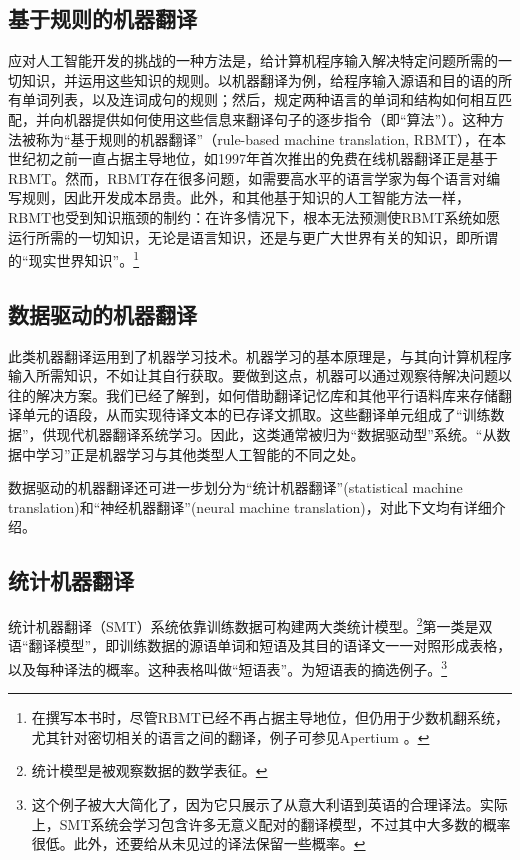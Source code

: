 \documentclass[output=paper]{langscibook}
\begin{document}
\subsection{基于规则的机器翻译}
应对人工智能开发的挑战的一种方法是，给计算机程序输入解决特定问题所需的一切知识，并运用这些知识的规则。以机器翻译为例，给程序输入源语和目的语的所有单词列表，以及连词成句的规则；然后，规定两种语言的单词和结构如何相互匹配，并向机器提供如何使用这些信息来翻译句子的逐步指令（即“算法”）。这种方法被称为“基于规则的机器翻译”（rule-based machine translation, RBMT），在本世纪初之前一直占据主导地位，如1997年首次推出的免费在线机器翻译正是基于RBMT\citep{Joscelyne1998}。然而，RBMT存在很多问题，如需要高水平的语言学家为每个语言对编写规则，因此开发成本昂贵。此外，和其他基于知识的人工智能方法一样\citep{deeplearningbook}，RBMT也受到知识瓶颈的制约：在许多情况下，根本无法预测使RBMT系统如愿运行所需的一切知识，无论是语言知识，还是与更广大世界有关的知识，即所谓的“现实世界知识”。\footnote{在撰写本书时，尽管RBMT已经不再占据主导地位，但仍用于少数机翻系统，尤其针对密切相关的语言之间的翻译，例子可参见Apertium \citep{Forcada2011}。}

\subsection{数据驱动的机器翻译}
此类机器翻译运用到了机器学习技术。机器学习的基本原理是，与其向计算机程序输入所需知识，不如让其自行获取。要做到这点，机器可以通过观察待解决问题以往的解决方案。我们已经了解到，如何借助翻译记忆库和其他平行语料库来存储翻译单元的语段，从而实现待译文本的已存译文抓取。这些翻译单元组成了“训练数据”，供现代机器翻译系统学习。因此，这类通常被归为“数据驱动型”系统。“从数据中学习”正是机器学习与其他类型人工智能的不同之处。

数据驱动的机器翻译还可进一步划分为“统计机器翻译”(statistical machine translation)和“神经机器翻译”(neural machine translation)，对此下文均有详细介绍。

\subsection{统计机器翻译}
统计机器翻译（SMT）系统依靠训练数据可构建两大类统计模型。\footnote{统计模型是被观察数据的数学表征。}第一类是双语“翻译模型”，即训练数据的源语单词和短语及其目的语译文一一对照形成表格，以及每种译法的概率。这种表格叫做“短语表”。为短语表的摘选例子。\footnote{这个例子被大大简化了，因为它只展示了从意大利语到英语的合理译法。实际上，SMT系统会学习包含许多无意义配对的翻译模型，不过其中大多数的概率很低。此外，还要给从未见过的译法保留一些概率。}
\end{document}
